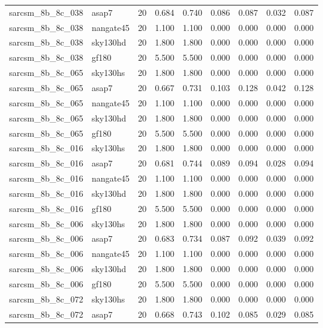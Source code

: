 \begin{tabular}{llrrrrrrr}
sarcsm\_8b\_8c\_038 & asap7 & 20 & 0.684 & 0.740 & 0.086 & 0.087 & 0.032 & 0.087 \\
sarcsm\_8b\_8c\_038 & nangate45 & 20 & 1.100 & 1.100 & 0.000 & 0.000 & 0.000 & 0.000 \\
sarcsm\_8b\_8c\_038 & sky130hd & 20 & 1.800 & 1.800 & 0.000 & 0.000 & 0.000 & 0.000 \\
sarcsm\_8b\_8c\_038 & gf180 & 20 & 5.500 & 5.500 & 0.000 & 0.000 & 0.000 & 0.000 \\
sarcsm\_8b\_8c\_065 & sky130hs & 20 & 1.800 & 1.800 & 0.000 & 0.000 & 0.000 & 0.000 \\
sarcsm\_8b\_8c\_065 & asap7 & 20 & 0.667 & 0.731 & 0.103 & 0.128 & 0.042 & 0.128 \\
sarcsm\_8b\_8c\_065 & nangate45 & 20 & 1.100 & 1.100 & 0.000 & 0.000 & 0.000 & 0.000 \\
sarcsm\_8b\_8c\_065 & sky130hd & 20 & 1.800 & 1.800 & 0.000 & 0.000 & 0.000 & 0.000 \\
sarcsm\_8b\_8c\_065 & gf180 & 20 & 5.500 & 5.500 & 0.000 & 0.000 & 0.000 & 0.000 \\
sarcsm\_8b\_8c\_016 & sky130hs & 20 & 1.800 & 1.800 & 0.000 & 0.000 & 0.000 & 0.000 \\
sarcsm\_8b\_8c\_016 & asap7 & 20 & 0.681 & 0.744 & 0.089 & 0.094 & 0.028 & 0.094 \\
sarcsm\_8b\_8c\_016 & nangate45 & 20 & 1.100 & 1.100 & 0.000 & 0.000 & 0.000 & 0.000 \\
sarcsm\_8b\_8c\_016 & sky130hd & 20 & 1.800 & 1.800 & 0.000 & 0.000 & 0.000 & 0.000 \\
sarcsm\_8b\_8c\_016 & gf180 & 20 & 5.500 & 5.500 & 0.000 & 0.000 & 0.000 & 0.000 \\
sarcsm\_8b\_8c\_006 & sky130hs & 20 & 1.800 & 1.800 & 0.000 & 0.000 & 0.000 & 0.000 \\
sarcsm\_8b\_8c\_006 & asap7 & 20 & 0.683 & 0.734 & 0.087 & 0.092 & 0.039 & 0.092 \\
sarcsm\_8b\_8c\_006 & nangate45 & 20 & 1.100 & 1.100 & 0.000 & 0.000 & 0.000 & 0.000 \\
sarcsm\_8b\_8c\_006 & sky130hd & 20 & 1.800 & 1.800 & 0.000 & 0.000 & 0.000 & 0.000 \\
sarcsm\_8b\_8c\_006 & gf180 & 20 & 5.500 & 5.500 & 0.000 & 0.000 & 0.000 & 0.000 \\
sarcsm\_8b\_8c\_072 & sky130hs & 20 & 1.800 & 1.800 & 0.000 & 0.000 & 0.000 & 0.000 \\
sarcsm\_8b\_8c\_072 & asap7 & 20 & 0.668 & 0.743 & 0.102 & 0.085 & 0.029 & 0.085 \\

\end{tabular}
